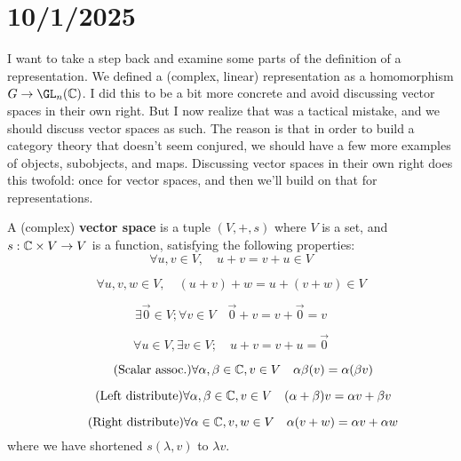 \section*{10/1/2025}


I want to take a step back and examine some parts of the definition of a representation.
We defined a (complex, linear) representation as a homomorphism $G\to \GL_n(\C)$.
I did this to be a bit more concrete and avoid discussing vector spaces in their own right.
But I now realize that was a tactical mistake, and we should discuss vector spaces as such.
The reason is that in order to build a category theory that doesn't seem conjured,
we should have a few more examples of objects, subobjects, and maps.
Discussing vector spaces in their own right does this twofold: once for vector spaces, 
and then we'll build on that for representations.

\begin{definition}
    A (complex) {\bf vector space} is a tuple $(V, +, s)$ where $V$ is a set, 
    and $s:\mathbb{C} \times V \to V$ is a function,
    satisfying the following properties:
    \begin{equation*}\tag{Commutative}
        \forall u,v\in V, \quad u+v = v+u\in V
    \end{equation*}

    \begin{equation*}\tag{Associative}
        \forall u,v,w\in V, \quad (u+v)+w = u+(v+w)\in V
    \end{equation*}

    \begin{equation*}\tag{Zero}
        \exists \vec{0}\in V; \forall v\in V \quad \vec{0}+v = v+\vec{0} = v
    \end{equation*}

    \begin{equation*}\tag{Negative}
        \forall u\in V, \exists v\in V; \quad u+v = v+u = \vec{0}
    \end{equation*}

    \begin{equation*}\tag{Scalar assoc.}
        \forall \alpha,\beta\in \mathbb{C}, v\in V \quad \alpha\beta(v) = \alpha(\beta v)
    \end{equation*}

    \begin{equation*}\tag{Left distribute}
        \forall \alpha,\beta\in \mathbb{C}, v\in V \quad (\alpha+\beta)v = \alpha v + \beta v 
    \end{equation*}

    \begin{equation*}\tag{Right distribute}
        \forall \alpha\in \mathbb{C}, v,w\in V \quad \alpha(v+w) = \alpha v + \alpha w
    \end{equation*}
    where we have shortened $s(\lambda,v)$ to $\lambda v$.
\end{definition}

